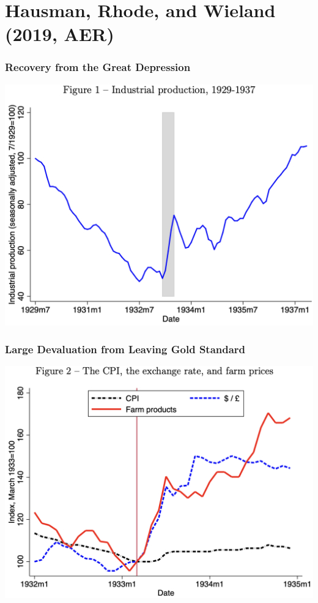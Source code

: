 \documentclass[english,xcolor=svgnames]{beamer}
\begin{document}
\section{Hausman, Rhode, and Wieland (2019, AER)}

\begin{frame}
\frametitle[alignment=center]{Recovery from the Great Depression}
\centering
\includegraphics[scale=0.5]{figures/HRWFIG1.png}
\end{frame}

\begin{frame}
\frametitle[alignment=center]{Large Devaluation from Leaving Gold Standard}
\centering
\includegraphics[scale=0.5]{figures/HRWFIG2.png}
\end{frame}
\end{document}
